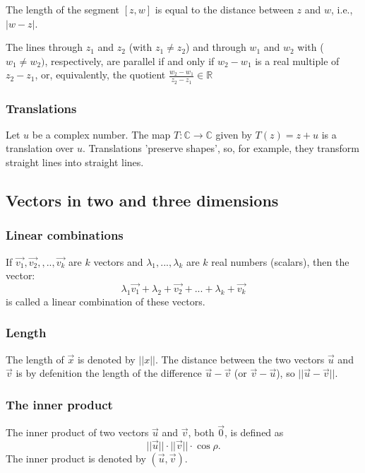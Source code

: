 \documentclass{article}
\begin{document}
			The length of the segment $[z,w]$ is equal to the distance between $z$ and $w$, i.e., $|w-z|$.
			
			The lines through $z_1$ and $z_2$ (with $z_1 \neq z_2$) and through $w_1$ and $w_2$ with ($w_1 \neq w_2)$, respectively, are parallel if and only if $w_2 - w_1$ is a real multiple of $z_2-z_1$, or, equivalently, the quotient $\frac{w_2-w_1}{z_2-z_1} \in \mathbb{R}$
			
			\subsubsection{Translations}
			Let $u$ be a complex number. The map $T: \mathbb{C} \to \mathbb{C}$ given by $T(z) = z+u$ is a translation over $u$. Translations 'preserve shapes', so, for example, they transform straight lines into straight lines.

		\subsection{Vectors in two and three dimensions}
			\subsubsection{Linear combinations}
			If $\vec{v_1},\vec{v_2},,..,\vec{v_k}$ are $k$ vectors and $\lambda_1,...,\lambda_k$ are $k$ real numbers (scalars), then the vector:
			\begin{equation*}
				\lambda_1\vec{v_1} + \lambda_2+\vec{v_2} + ... + \lambda_k+\vec{v_k}
			\end{equation*}
			is called a linear combination of these vectors.
			
			\subsubsection{Length}
			The length of $\vec{x}$ is denoted by $||x||$. The distance between the two vectors $\vec{u}$ and $\vec{v}$ is by defenition the length of the difference $\vec{u}- \vec{v}$ (or $\vec{v} - \vec{u}$), so $||\vec{u} - \vec{v}||$.
			
			\subsubsection{The inner product}
			The inner product of two vectors $\vec{u}$ and $\vec{v}$, both $\vec{0}$, is defined as
			\begin{equation*}
				||\vec{u}|| \cdot ||\vec{v}|| \cdot \cos{\rho}.
			\end{equation*}
			The inner product is denoted by $(\vec{u}, \vec{v})$.
			
\end{document}
